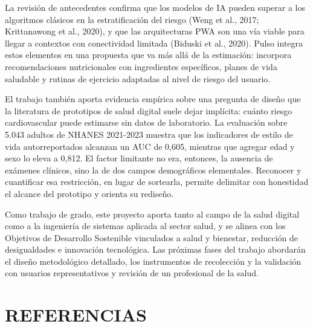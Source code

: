 \documentclass[12pt,letterpaper]{article}
\begin{document}
La revisión de antecedentes confirma que los modelos de IA pueden superar a los
algoritmos clásicos en la estratificación del riesgo (Weng et al., 2017;
Krittanawong et al., 2020), y que las arquitecturas PWA son una vía viable para
llegar a contextos con conectividad limitada (Biduski et al., 2020). Pulso
integra estos elementos en una propuesta que va más allá de la estimación:
incorpora recomendaciones nutricionales con ingredientes específicos, planes de
vida saludable y rutinas de ejercicio adaptadas al nivel de riesgo del usuario.

El trabajo también aporta evidencia empírica sobre una pregunta de diseño que la
literatura de prototipos de salud digital suele dejar implícita: cuánto riesgo
cardiovascular puede estimarse sin datos de laboratorio. La evaluación sobre
5.043 adultos de NHANES 2021-2023 muestra que los indicadores de estilo de vida
autorreportados alcanzan un AUC de 0,605, mientras que agregar edad y sexo lo
eleva a 0,812. El factor limitante no era, entonces, la ausencia de exámenes
clínicos, sino la de dos campos demográficos elementales. Reconocer y cuantificar
esa restricción, en lugar de sortearla, permite delimitar con honestidad el
alcance del prototipo y orienta su rediseño.

Como trabajo de grado, este proyecto aporta tanto al campo de la salud digital
como a la ingeniería de sistemas aplicada al sector salud, y se alinea con los
Objetivos de Desarrollo Sostenible vinculados a salud y bienestar, reducción de
desigualdades e innovación tecnológica. Las próximas fases del trabajo abordarán
el diseño metodológico detallado, los instrumentos de recolección y la validación
con usuarios representativos y revisión de un profesional de la salud.

\newpage

\section*{REFERENCIAS}
\end{document}
